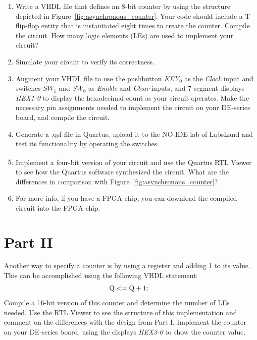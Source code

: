 \documentclass[epsfig,10pt,fullpage]{article}
\begin{document}
\begin{enumerate}
\item Write a VHDL file that defines an 8-bit counter by using the structure
depicted in Figure~\ref{fig:asynchronous_counter}. Your code should include a T 
flip-flop entity that is instantiated
eight times to create the counter. Compile the circuit. How many logic elements (LEs) are 
used to implement your circuit? 
\item Simulate your circuit to verify its correctness.
\item Augment your VHDL file to use the pushbutton {\it KEY}$_0$ as the {\it Clock}
input and switches $SW_1$ and $SW_0$ as {\it Enable} and {\it Clear} inputs, and
7-segment displays {\it HEX1-0} to display the hexadecimal count as your circuit
operates. Make the necessary pin assignments needed to implement the circuit on your
DE-series board, and compile the circuit.
\item Generate a .qsf file in Quartus, upload it to the NO-IDE lab of LabsLand and test its functionality by operating
the switches.
\item Implement a four-bit version of your circuit and use the Quartus\textsuperscript{\textregistered} RTL Viewer to
see how the Quartus software synthesized the circuit. What are the differences in
comparison with Figure~\ref{fig:asynchronous_counter}?
\item For more info, if you have a FPGA chip, you can download the compiled circuit into the FPGA chip.
\end{enumerate}

\section*{Part II}
Another way to specify a counter is by using a register and adding 1 to its value. 
This can be accomplished using the following VHDL statement:
$$
{\rm Q <= Q + 1;}
$$
\noindent
Compile a 16-bit version of this counter and determine the number of LEs needed.  Use the RTL 
Viewer to see the structure of this implementation and comment on the differences with the 
design from Part I. Implement the counter on your DE-series board, using the displays 
{\it HEX3-0} to show the counter value.
\end{document}
